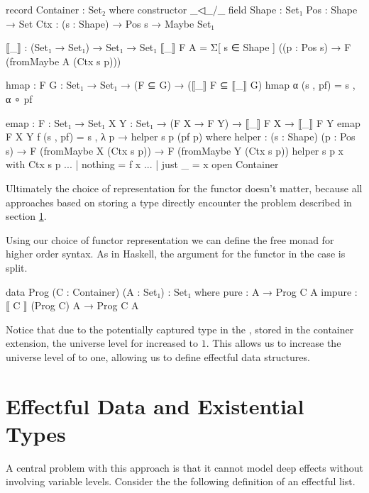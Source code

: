 \begin{code}
record Container : Set₂ where
  constructor _◁_/_
  field
    Shape : Set₁
    Pos : Shape → Set
    Ctx : (s : Shape) → Pos s → Maybe Set₁

  ⟦_⟧ : (Set₁ → Set₁) → Set₁ → Set₁
  ⟦_⟧ F A = Σ[ s ∈ Shape ] ((p : Pos s) → F (fromMaybe A (Ctx s p)))

  hmap : {F G : Set₁ → Set₁} → (F ⊆ G) → (⟦_⟧ F ⊆ ⟦_⟧ G)
  hmap α (s , pf) = s , α ∘ pf

  emap : {F : Set₁ → Set₁} {X Y : Set₁} → (F X → F Y) → ⟦_⟧ F X → ⟦_⟧ F Y
  emap {F} {X} {Y} f (s , pf) = s , λ p → helper s p (pf p)
    where helper : (s : Shape) (p : Pos s) → 
            F (fromMaybe X (Ctx s p)) → F (fromMaybe Y (Ctx s p))
          helper s p x with Ctx s p
          ... | nothing = f x
          ... | just _  = x
open Container
\end{code}
Ultimately the choice of representation for the functor doesn't matter, because
all approaches based on storing a type directly encounter the problem described
in section \ref{higher-order:eff-data-ext-types}.

Using our choice of functor representation we can define the free monad for
higher order syntax.
As in Haskell, the argument for the functor in the
 case is split.

\begin{code}
data Prog (C : Container) (A : Set₁) : Set₁ where
  pure    : A → Prog C A
  impure  : ⟦ C ⟧ (Prog C) A → Prog C A
\end{code}
Notice that due to the potentially captured type in the ,
stored in the container extension, the universe level for 
increased to $1$.
This allows us to increase the universe level of  to one,
allowing us to define effectful data structures.


\section{Effectful Data and Existential Types}
\label{higher-order:eff-data-ext-types}

A central problem with this approach is that it cannot model deep effects
without involving variable levels.
Consider the the following definition of an effectful list.

